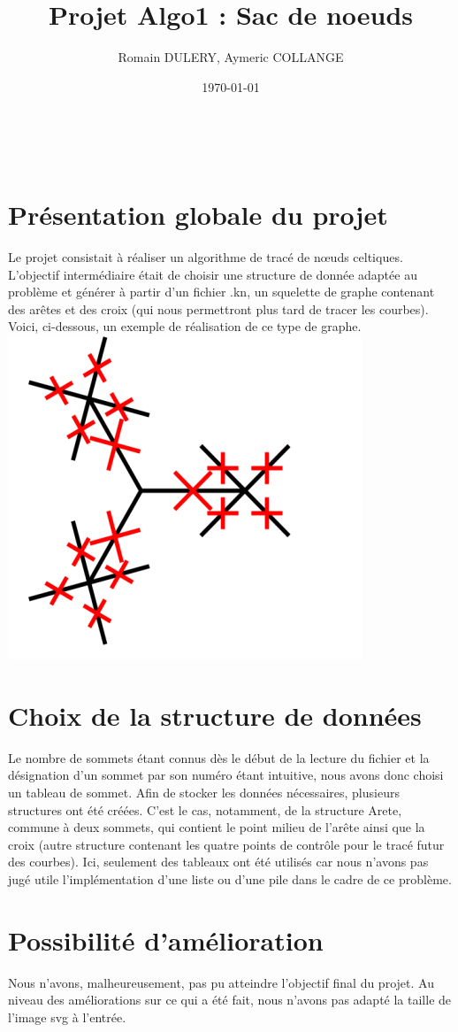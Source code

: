\documentclass[a4paper,11pt]{article}
\title{Projet Algo1 : Sac de noeuds}
\author{Romain DULERY, Aymeric COLLANGE}
\date{\today}
\begin{document}
\maketitle

~\\
\section{Présentation globale du projet}

Le projet consistait à réaliser un algorithme de tracé de nœuds celtiques.
L'objectif intermédiaire était de choisir une structure de donnée adaptée au problème et générer à partir d'un fichier .kn, un squelette de graphe contenant des arêtes et des croix (qui nous permettront  plus tard de tracer les courbes).
Voici, ci-dessous, un exemple de réalisation de ce type de graphe.\\

\includegraphics{Banana4.png}
~\\

\section{Choix de la structure de données}

Le nombre de sommets étant connus dès le début de la lecture du fichier et la désignation d'un sommet par son numéro étant intuitive, nous avons donc choisi un tableau de sommet.
Afin de stocker les données nécessaires, plusieurs structures ont été créées. C'est le cas, notamment, de la structure Arete, commune à deux sommets, qui contient le point milieu de l'arête ainsi que la croix (autre structure contenant les quatre points de contrôle pour le tracé futur des courbes).
Ici, seulement des tableaux ont été utilisés car nous n'avons pas jugé utile l'implémentation d'une liste ou d'une pile dans le cadre de ce problème.

\section{Possibilité d'amélioration}

Nous n'avons, malheureusement, pas pu atteindre l'objectif final du projet.
Au niveau des améliorations sur ce qui a été fait, nous n'avons pas adapté la taille de l'image svg à l'entrée.
\end{document}
